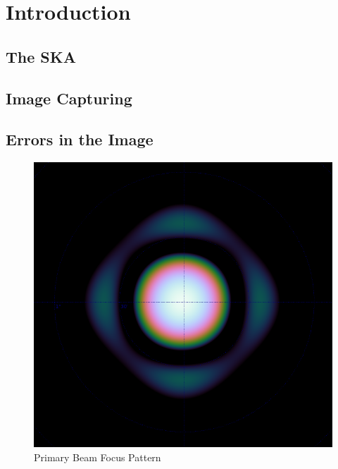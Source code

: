 \section{Introduction}\label{int}
\subsection{The SKA}\label{int:sec:ska}
\subsection{Image Capturing}\label{int:sec:img}
\subsection{Errors in the Image}\label{int:sec:err}
\begin{figure}[H]
	\centering
	\label{int:fig:beam}
	\includegraphics[scale=0.28]{Images/beam.png}
	\caption{Primary Beam Focus Pattern\cite{oleg}}
\end{figure}
